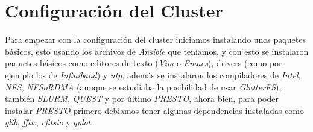 \section{Configuración del Cluster}

Para empezar con la configuración del cluster iniciamos instalando unos paquetes básicos, esto
usando los archivos de \emph{Ansible} que teníamos, y con esto se instalaron paquetes básicos como
editores de texto (\emph{Vim} o \emph{Emacs}), drivers (como por ejemplo los de \emph{Infiniband}) y 
\emph{ntp}, además se instalaron los compiladores de \emph{Intel}, \emph{NFS}, \emph{NFSoRDMA}
(aunque se estudiaba la posibilidad de usar \emph{GlutterFS}), también \emph{SLURM}, \emph{QUEST} y 
por último \emph{PRESTO}, ahora bien, para poder instalar \emph{PRESTO} primero debiamos tener
algunas dependencias instaladas como \emph{glib}, \emph{fftw}, \emph{cfitsio} y \emph{gplot}.